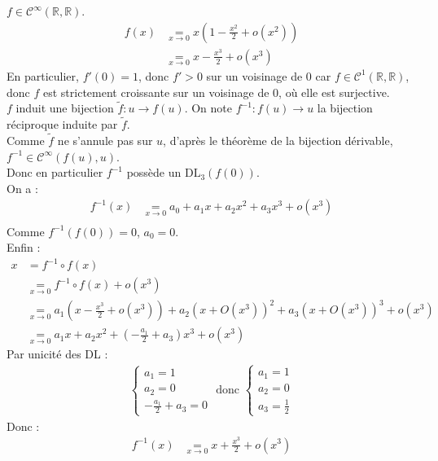 \documentclass[../main.tex]{subfiles}
\begin{document}
\noindent $f\in \mathcal{C}^{\infty}(\mathbb{R}, \mathbb{R})$. 
\begin{align*}
    f(x) &\underset{x\to 0}{=} x \left( 1 - \frac{x^2}{2} + o(x^2) \right) \\
    &\underset{x\to 0}{=} x - \frac{x^3}{2} + o(x^3)
\end{align*}
En particulier, $f'(0) = 1$, donc $f' > 0$ sur un voisinage de $0$ car $f\in \mathcal{C}^1(\mathbb{R}, \mathbb{R})$, donc $f$ est strictement croissante sur un voisinage de $0$, où elle est surjective. \\
$f$ induit une bijection $\tilde{f}: u\to f(u)$. On note $f^{-1}:f(u)\to u$ la bijection réciproque induite par $\tilde{f}$. \\
Comme $\tilde f$ ne s'annule pas sur $u$, d'après le théorème de la bijection dérivable, $f^{-1} \in \mathcal{C}^{\infty}(f(u), u)$. \\
Donc en particulier $f^{-1}$ possède un $\text{DL}_3(f(0))$. \\
On a : 
\begin{align*}
    f^{-1}(x) &\underset{x\to 0}{=} a_0 + a_1 x + a_2 x^2 + a_3 x^3 + o(x^3) \\
\end{align*}
Comme $f^{-1}(f(0)) = 0$, $a_0 = 0$. \\
Enfin : 
\begin{align*}
    x &= f^{-1} \circ f(x) \\
    &\underset{x\to 0}{=} f^{-1} \circ f(x) + o(x^3) \\
    &\underset{x\to 0}{=} a_1 \left( x - \frac{x^3}{2} + o(x^3) \right) + a_2 (x + O(x^3))^2 + a_3 (x + O(x^3))^3 + o(x^3) \\
    &\underset{x\to 0}{=} a_1 x + a_2 x^2 + \left( -\frac{a_1}{2} + a_3 \right) x^3 + o(x^3)
\end{align*}
Par unicité des DL : 
\begin{align*}
    \begin{cases}
        a_1 = 1 \\
        a_2 = 0 \\
        -\frac{a_1}{2} + a_3 = 0
    \end{cases}
    \text{ donc }
    \begin{cases}
        a_1 = 1 \\
        a_2 = 0 \\
        a_3 = \frac{1}{2}
    \end{cases}
\end{align*}
Donc : 
\begin{align*}
    f^{-1}(x) &\underset{x\to 0}{=} x + \frac{x^3}{2} + o(x^3)
\end{align*}
\end{document}
